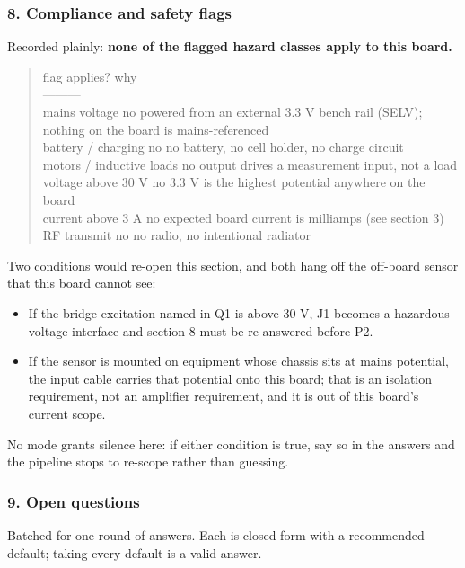 \documentclass[11pt,a4paper]{article}
\begin{document}
\subsubsection*{8. Compliance and safety flags}
Recorded plainly: \textbf{none of the flagged hazard classes apply to this board.}

\begin{quote}\small\ttfamily\raggedright
\textbar{} flag \textbar{} applies? \textbar{} why \textbar{}\\
\textbar{}---\textbar{}---\textbar{}---\textbar{}\\
\textbar{} mains voltage \textbar{} no \textbar{} powered from an external 3.3 V bench rail (SELV); nothing on the board is mains-referenced \textbar{}\\
\textbar{} battery / charging \textbar{} no \textbar{} no battery, no cell holder, no charge circuit \textbar{}\\
\textbar{} motors / inductive loads \textbar{} no \textbar{} output drives a measurement input, not a load \textbar{}\\
\textbar{} voltage above 30 V \textbar{} no \textbar{} 3.3 V is the highest potential anywhere on the board \textbar{}\\
\textbar{} current above 3 A \textbar{} no \textbar{} expected board current is milliamps (see section 3) \textbar{}\\
\textbar{} RF transmit \textbar{} no \textbar{} no radio, no intentional radiator \textbar{}
\end{quote}
Two conditions would re-open this section, and both hang off the off-board sensor that this board cannot see:

\begin{itemize}
\item If the bridge excitation named in Q1 is above 30 V, J1 becomes a
hazardous-voltage interface and section 8 must be re-answered before P2.
\item If the sensor is mounted on equipment whose chassis sits at mains potential,
the input cable carries that potential onto this board; that is an isolation
requirement, not an amplifier requirement, and it is out of this board's
current scope.
\end{itemize}
No mode grants silence here: if either condition is true, say so in the answers and the pipeline stops to re-scope rather than guessing.

\subsubsection*{9. Open questions}
Batched for one round of answers. Each is closed-form with a recommended default; taking every default is a valid answer.
\end{document}
